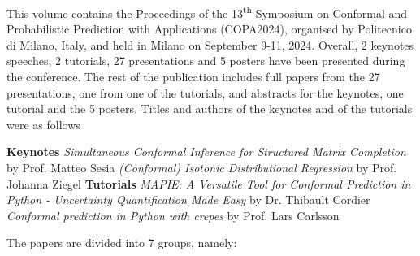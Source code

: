 \documentclass[twoside,11pt]{article}
\begin{document}
\maketitle
This volume contains the Proceedings of the 13\textsuperscript{th} Symposium on Conformal and Probabilistic Prediction with Applications (COPA2024), organised by Politecnico di Milano, Italy, and held in Milano on September 9-11, 2024.
Overall, 2 keynotes speeches, 2 tutorials, 27 presentations and 5 posters have been presented during the conference. The rest of the publication includes full papers from the 27 presentations, one from one of the tutorials, and abstracts for the keynotes, one tutorial and the 5 posters.
Titles and authors of the keynotes and of the tutorials were as follows
\begin{outline}
    \1 \textbf{Keynotes}
        \2\emph{Simultaneous Conformal Inference for Structured Matrix Completion} by Prof. Matteo Sesia
        \2\emph{(Conformal) Isotonic Distributional Regression} by Prof. Johanna Ziegel
    \1 \textbf{Tutorials}
        \2\emph{MAPIE: A Versatile Tool for Conformal Prediction in Python - Uncertainty Quantification Made Easy} by Dr. Thibault Cordier
        \2\emph{Conformal prediction in Python with crepes} by Prof. Lars Carlsson
\end{outline}
The papers are divided into 7 groups, namely:
\end{document}
